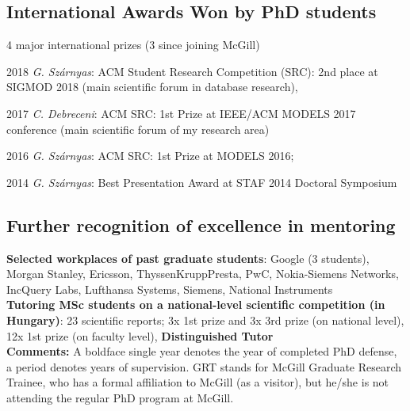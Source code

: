 \subsection{International Awards Won by PhD students}

4 major international prizes (3 since joining McGill) 
\begin{yearlist}
\item[2018] \emph{G. Sz\'arnyas}: ACM Student Research Competition (SRC): 2nd place at SIGMOD 2018 (main scientific forum in database research),
\item[2017] \emph{C. Debreceni}: ACM SRC: 1st Prize at IEEE/ACM MODELS 2017 conference (main scientific forum of my research area)
\item[2016] \emph{G. Sz\'arnyas}: ACM SRC: 1st Prize at MODELS 2016; 
\item[2014] \emph{G. Sz\'arnyas}: Best Presentation Award at STAF 2014 Doctoral Symposium
\end{yearlist}

\subsection{Further recognition of excellence in mentoring}

\textbf{Selected workplaces of past graduate students}: Google (3 students), Morgan Stanley, Ericsson, ThyssenKruppPresta, PwC, Nokia-Siemens Networks, 
IncQuery Labs, Lufthansa Systems, Siemens, National Instruments \\

\noindent
\textbf{Tutoring MSc students on a national-level scientific competition (in Hungary)}: 
23 scientific reports; 3x 1st prize and 3x 3rd prize (on national
level), 12x 1st prize (on faculty level), %
\textbf{Distinguished Tutor}  \\%

\noindent
\textbf{Comments:} A boldface single year denotes the year of completed PhD defense, a period denotes years of supervision. GRT stands for McGill Graduate Research Trainee, who has a formal affiliation to McGill (as a visitor), but he/she is not attending the regular PhD program at McGill. %
\\

